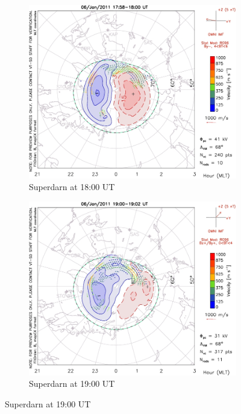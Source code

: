 \documentclass[10pt,a4paper]{article}
\begin{document}
\begin{figure}
\centering
\begin{subfigure}{0.3\textwidth}
\centering
	\includegraphics[width=\textwidth]{Superdarn1.jpg}
	\caption{ Superdarn at 18:00 UT \label{Super_18}}
\end{subfigure}
\begin{subfigure}{0.3\textwidth}
\centering
	\includegraphics[width=\textwidth]{Superdarn2.jpg}
	\caption{ Superdarn at 19:00 UT \label{Super_19}}
\end{subfigure}

\end{figure}
\end{document}
